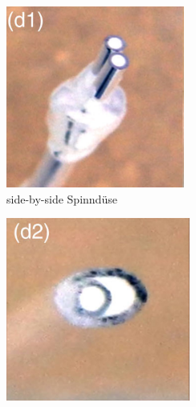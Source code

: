 \begin{figure}[!h]
     \centering
     \begin{subfigure}[]{.28\textwidth}
         \centering
         \includegraphics[width=\textwidth]{Abbildungen/side-by-side.png}
         \caption{side-by-side Spinndüse \vspace{3.9mm}}
         \label{fig:side-by-side}
     \end{subfigure}
     \hspace{5mm}
     \begin{subfigure}[]{.285\textwidth}
         \includegraphics[width=\textwidth]{Abbildungen/acentric_sideby-side.png}

\end{subfigure}
\end{figure}
